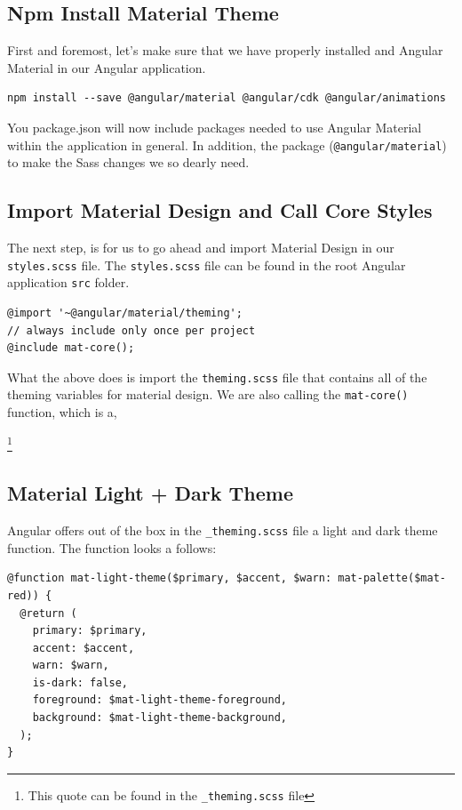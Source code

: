 \subsection{Npm Install Material Theme}
First and foremost, let's make sure that we have properly installed and Angular
Material in our Angular application. 
\begin{lstlisting}
npm install --save @angular/material @angular/cdk @angular/animations
\end{lstlisting}

You package.json will now include packages needed to use Angular Material 
within the application in general. In addition, the package
(\lstinline{@angular/material}) to make the Sass changes we so dearly need. 

\subsection{Import Material Design and Call Core Styles}
The next step, is for us to go ahead and import Material Design in our 
\lstinline{styles.scss} file. The \lstinline{styles.scss} file can be found
in the root Angular application \lstinline{src} folder.

\begin{lstlisting}[caption=styles.scss]
@import '~@angular/material/theming';
// always include only once per project
@include mat-core();
\end{lstlisting}


What the above does is import the \lstinline{theming.scss} file that contains
all of the theming variables for material design. We are also calling the
\lstinline{mat-core()} function, which is a, \begin{quote}
\end{quote} \footnote{This quote can be found in the \lstinline{_theming.scss}
file}

\subsection{Material Light + Dark Theme}
Angular offers out of the box in the \lstinline{_theming.scss} file a light and
dark theme function. The function looks a follows: 
\begin{lstlisting}
@function mat-light-theme($primary, $accent, $warn: mat-palette($mat-red)) {
  @return (
    primary: $primary,
    accent: $accent,
    warn: $warn,
    is-dark: false,
    foreground: $mat-light-theme-foreground,
    background: $mat-light-theme-background,
  );
}  
\end{lstlisting}

